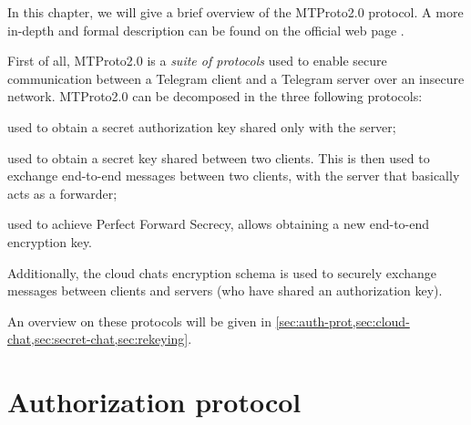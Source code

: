 \label{sec:mtproto2-informal}

In this chapter, we will give a brief overview of the MTProto2.0 protocol. A more in-depth and formal description can be found on the official web page \cite{Telegram-MTProto2.0}.

First of all, MTProto2.0 is a \textit{suite of protocols} used to enable secure communication between a Telegram client and a Telegram server over an insecure network. MTProto2.0 can be decomposed in the three following protocols:

\begin{description}[style=nextline]
    \item[Authorization] used to obtain a secret authorization key shared only with the server;
    \item[Secret-chat] used to obtain a secret key shared between two clients. This is then used to exchange end-to-end messages between two clients, with the server that basically acts as a forwarder;
    \item[Rekeying] used to achieve Perfect Forward Secrecy, allows obtaining a new end-to-end encryption key.
\end{description}

Additionally, the cloud chats encryption schema is used to securely exchange messages between clients and servers (who have shared an authorization key).

An overview on these protocols will be given in \cref{sec:auth-prot,sec:cloud-chat,sec:secret-chat,sec:rekeying}.

\section{Authorization protocol}
\label{sec:auth-prot}

